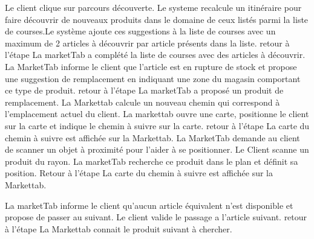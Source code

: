 \alternatifs
\startalternatif[UGM:SA1]
\etape Le client clique sur parcours découverte.
\etape Le systeme recalcule un itinéraire pour faire découvrir de nouveaux produits dans le domaine de ceux listés parmi la liste de courses.Le système ajoute ces suggestions à la liste de courses avec un maximum de 2 articles à découvrir par article présents dans la liste.
\etape retour à l'étape 
\stopcondition
\postcondition La marketTab a complété la liste de courses avec des articles à découvrir.
\stopalternatif
\startalternatif[UGM:SA1]
\etape La MarketTab informe le client que l'article est en rupture de stock et propose une suggestion de remplacement en indiquant une zone du magasin comportant ce type de produit.
\etape retour à l'étape 
\stopcondition
\postcondition La marketTab a proposé un produit de remplacement.
\stopalternatif
{}
\etape La Markettab calcule un nouveau chemin qui correspond à l'emplacement actuel du client. 
\etape La markettab ouvre une carte, positionne le client sur la carte et indique le chemin à suivre sur la carte.
\etape retour à l'étape 
\stopcondition
\postcondition La carte du chemin à suivre est affichée sur la Markettab.
\stopalternatif
\startalternatif[UGM:SA1]
\etape La MarketTab demande au client de scanner un objet à proximité pour l'aider à se positionner. 
\etape Le Client scanne un produit du rayon.
\etape La marketTab recherche ce produit dans le plan et définit sa position.
\etape Retour à l'étape \in[UGM:SA1]
\stopcondition
\postcondition La carte du chemin à suivre est affichée sur la Markettab.
\stopalternatif

\exception
\startalternatif[UGM:SA1]
  \etape La marketTab informe le client qu'aucun article équivalent n'est disponible et propose de passer au suivant.
  \etape Le client valide le passage a l'article suivant.
  \etape retour à l'étape 
\stopcondition
\postcondition La Markettab connait le produit suivant à chercher.
\stopalternatif
\stopCU
